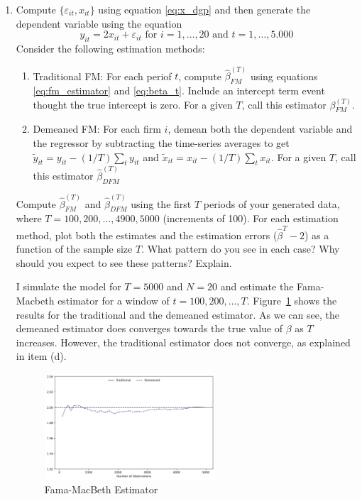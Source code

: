 \documentclass[12pt,twoside]{article}
\begin{document}
\begin{enumerate}[label = (\alph*)]
    \item  Compute \(\lbrace \varepsilon_{it}, x_{it}\rbrace\) using equation \ref{eq:x_dgp} and then generate the dependent variable using the equation
    \[
        y_{it} = 2x_{it} + \varepsilon_{it} \text{ for } i = 1, \dots, 20 \text{ and } t = 1, \dots, 5.000
    \]
    Consider the following estimation methods:
    \begin{enumerate}[label = \arabic*.]
        \item Traditional FM: For each periof \(t\), compute \(\widehat\beta^{(T)}_{FM}\) using equations \ref{eq:fm_estimator} and \ref{eq:beta_t}. Include an intercept term event thought the true intercept is zero. For a given \(T\), call this estimator \(\beta^{(T)}_{FM}\).
        \item Demeaned FM: For each firm \(i\), demean both the dependent variable and the regressor by subtracting the time-series averages to get \(\tilde y_{it} = y_{it} - \left(1/T\right)\sum_t y_{it}\) and \(\tilde x_{it} = x_{it} - \left(1/T\right)\sum_t x_{it}\). For a given \(T\), call this estimator \(\widehat \beta^{(T)}_{DFM}\)
    \end{enumerate}
    Compute \(\widehat\beta^{(T)}_{FM}\) and \(\widehat\beta^{(T)}_{DFM}\) using the first \(T\) periods of your generated data, where \(T = 100, 200, \dots, 4900, 5000\) (increments of 100). For each estimation method, plot both the estimates and the estimation errors (\(\widehat\beta^T-2\)) as a function of the sample size \(T\). What pattern do you see in each case? Why should you expect to see these patterns? Explain.
    
    \begin{solution}
        I simulate the model for \(T = 5000\) and \(N = 20\) and estimate the Fama-Macbeth estimator for a window of \(t = 100, 200,  \dots, T\). Figure~\ref{fig:beta_fm_a} shows the results for the traditional and the demeaned estimator. As we can see, the demeaned estimator does converges towards the true value of \(\beta\) as \(T\) increases. However, the traditional estimator does not converge, as explained in item (d).
        \begin{figure}[!htbp]
            \centering
            \includegraphics[width=0.6\textwidth]{images/beta_fm_a}
            \caption{Fama-MacBeth Estimator}
            \label{fig:beta_fm_a}
        \end{figure}
    \end{solution}


\end{enumerate}
\end{document}
